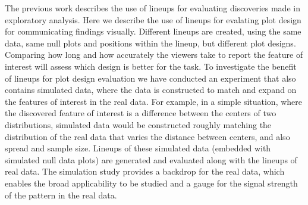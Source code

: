 The previous work \citet{buja:2009,wickham:2010} describes the use of
lineups for evaluating discoveries made in exploratory analysis. Here
we describe the use of lineups for evalating plot design for
communicating findings visually. Different lineups are created, using
the same data, same null plots and positions within the lineup, but
different plot designs. Comparing how long and how accurately the
viewers take to report the feature of interest will assess which
design is better for the task. To investigate the benefit of lineups
for plot design evaluation we have conducted an experiment that also
contains simulated data, where the data is constructed to match and
expand on the features of interest in the real data. For example, in a
simple situation, where the discovered feature of interest is a
difference between the centers of two distributions, simulated data
would be constructed roughly matching the distribution of the real
data that varies the distance between centers, and also spread and
sample size. Lineups of these simulated data (embedded with simulated
null data plots) are generated and evaluated along with the lineups of
real data. The simulation study provides a backdrop for the real data,
which enables the broad applicability to be studied and a gauge for
the signal strength of the pattern in the real data. 




